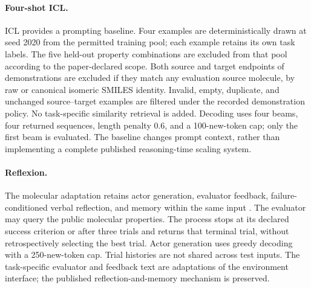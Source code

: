 \paragraph{Four-shot ICL.}
ICL \citep{brown2020} provides a prompting baseline. Four examples are deterministically drawn at seed 2020 from the permitted training pool; each example retains its own task labels. The five held-out property combinations are excluded from that pool according to the paper-declared scope. Both source and target endpoints of demonstrations are excluded if they match any evaluation source molecule, by raw or canonical isomeric SMILES identity. Invalid, empty, duplicate, and unchanged source--target examples are filtered under the recorded demonstration policy. No task-specific similarity retrieval is added. Decoding uses four beams, four returned sequences, length penalty 0.6, and a 100-new-token cap; only the first beam is evaluated. The baseline changes prompt context, rather than implementing a complete published reasoning-time scaling system.

\paragraph{Reflexion.}
The molecular adaptation retains actor generation, evaluator feedback, failure-conditioned verbal reflection, and memory within the same input \citep{reflexion2023}. The evaluator may query the public molecular properties. The process stops at its declared success criterion or after three trials and returns that terminal trial, without retrospectively selecting the best trial. Actor generation uses greedy decoding with a 250-new-token cap. Trial histories are not shared across test inputs. The task-specific evaluator and feedback text are adaptations of the environment interface; the published reflection-and-memory mechanism is preserved.
